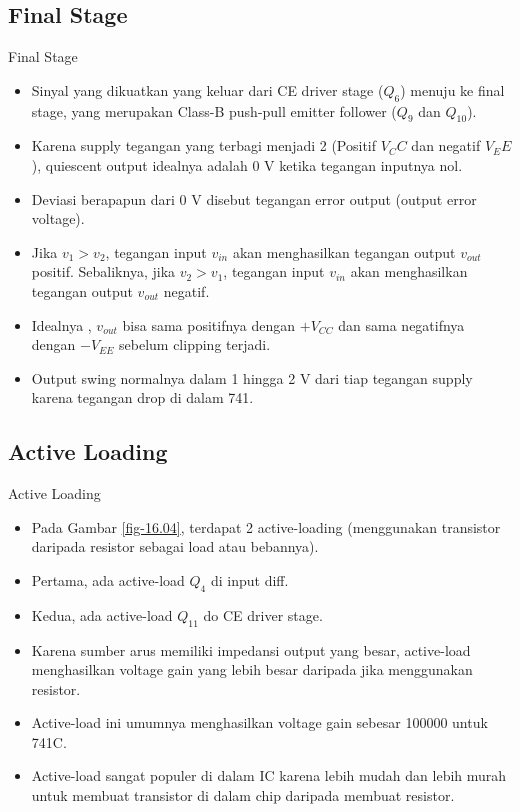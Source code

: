 \subsection{Final Stage}

\begin{frame}{Final Stage}
	\begin{itemize}
		\item Sinyal yang dikuatkan yang keluar dari CE driver stage ($ Q_6 $) menuju ke final stage, yang merupakan Class-B push-pull emitter follower ($ Q_9 $ dan $ Q_{10} $).
		\item Karena supply tegangan yang terbagi menjadi 2 (Positif $ V_CC $ dan negatif $ V_EE $), quiescent output idealnya adalah 0 V ketika tegangan inputnya nol.
		\item Deviasi berapapun dari 0 V disebut tegangan error output (output error voltage).
		\item Jika $ v_1 > v_2 $, tegangan input $ v_{in} $ akan menghasilkan tegangan output $ v_{out} $ positif. Sebaliknya, jika $ v_2 > v_1 $, tegangan input $ v_{in} $ akan menghasilkan tegangan output $ v_{out} $ negatif.
		\item Idealnya , $ v_{out} $ bisa sama positifnya dengan $ +V_{CC} $ dan sama negatifnya dengan $ -V_{EE} $ sebelum clipping terjadi.
		\item Output swing normalnya dalam 1 hingga 2 V dari tiap tegangan supply karena tegangan drop di dalam 741.
	\end{itemize}
\end{frame}

\subsection{Active Loading}

\begin{frame}{Active Loading}
	\begin{itemize}
		\item Pada Gambar \ref{fig-16.04}, terdapat 2 active-loading (menggunakan transistor daripada resistor sebagai load atau bebannya).
		\item Pertama, ada active-load $ Q_4 $ di input diff.
		\item Kedua, ada active-load $ Q_{11} $ do CE driver stage.
		\item Karena sumber arus memiliki impedansi output yang besar, active-load menghasilkan voltage gain yang lebih besar daripada jika menggunakan resistor.
		\item Active-load ini umumnya menghasilkan voltage gain sebesar 100000 untuk 741C.
		\item Active-load sangat populer di dalam IC karena lebih mudah dan lebih murah untuk membuat transistor di dalam chip daripada membuat resistor.
	\end{itemize}
\end{frame}

